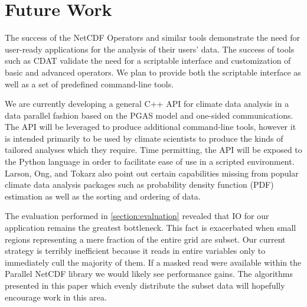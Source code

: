 \section{Future Work}
\label{section:future}

The success of the NetCDF Operators\cite{NCO} and similar tools demonstrate
the need for user-ready applications for the analysis of their users' data.  
The success of tools such as CDAT\cite{CDAT} validate the need for a
scriptable interface and customization of basic and advanced operators.  We
plan to provide both the scriptable interface as well as a set of predefined
command-line tools.

We are currently developing a general C++ API for climate data analysis in a
data parallel fashion based on the PGAS model and one-sided communications.
The API will be leveraged to produce additional command-line tools, however it
is intended primarily to be used by climate scientists to produce the kinds of
tailored analyses which they require.  Time permitting, the API will be
exposed to the Python language in order to facilitate ease of use in a
scripted environment.  Larson, Ong, and Tokarz also point out certain
capabilities missing from popular climate data analysis packages such as
probability density function (PDF) estimation as well as the sorting and
ordering of data.

The evaluation performed in \ref{section:evaluation} revealed that IO for our
application remains the greatest bottleneck.  This fact is exacerbated when
small regions representing a mere fraction of the entire grid are subset.  Our
current strategy is terribly inefficient because it reads in entire variables
only to immediately cull the majority of them.  If a masked read were
available within the Parallel NetCDF library we would likely see performance
gains.  The algorithms presented in this paper which evenly distribute the
subset data will hopefully encourage work in this area.
